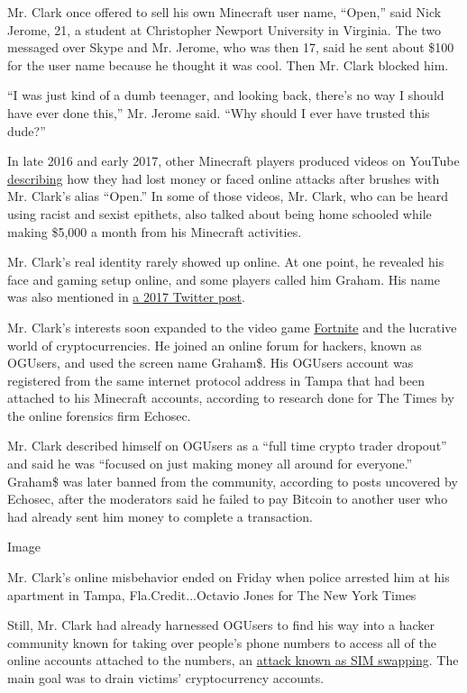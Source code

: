 Mr. Clark once offered to sell his own Minecraft user name, ``Open,''
said Nick Jerome, 21, a student at Christopher Newport University in
Virginia. The two messaged over Skype and Mr. Jerome, who was then 17,
said he sent about \$100 for the user name because he thought it was
cool. Then Mr. Clark blocked him.

``I was just kind of a dumb teenager, and looking back, there's no way I
should have ever done this,'' Mr. Jerome said. ``Why should I ever have
trusted this dude?''

In late 2016 and early 2017, other Minecraft players produced videos on
YouTube \href{https://www.youtube.com/watch?v=CvrPXbk-BXw}{describing}
how they had lost money or faced online attacks after brushes with Mr.
Clark's alias ``Open.'' In some of those videos, Mr. Clark, who can be
heard using racist and sexist epithets, also talked about being home
schooled while making \$5,000 a month from his Minecraft activities.

Mr. Clark's real identity rarely showed up online. At one point, he
revealed his face and gaming setup online, and some players called him
Graham. His name was also mentioned in
\href{https://twitter.com/opengrahamclark/status/848014008632344576}{a
2017 Twitter post}.

Mr. Clark's interests soon expanded to the video game
\href{https://www.nytimes.com/2018/07/25/arts/what-is-fortnite-battle-royale-nyt.html}{Fortnite}
and the lucrative world of cryptocurrencies. He joined an online forum
for hackers, known as OGUsers, and used the screen name Graham\$. His
OGUsers account was registered from the same internet protocol address
in Tampa that had been attached to his Minecraft accounts, according to
research done for The Times by the online forensics firm Echosec.

Mr. Clark described himself on OGUsers as a ``full time crypto trader
dropout'' and said he was ``focused on just making money all around for
everyone.'' Graham\$ was later banned from the community, according to
posts uncovered by Echosec, after the moderators said he failed to pay
Bitcoin to another user who had already sent him money to complete a
transaction.

Image

Mr. Clark's online misbehavior ended on Friday when police arrested him
at his apartment in Tampa, Fla.Credit...Octavio Jones for The New York
Times

Still, Mr. Clark had already harnessed OGUsers to find his way into a
hacker community known for taking over people's phone numbers to access
all of the online accounts attached to the numbers, an
\href{https://www.nytimes.com/2017/08/21/business/dealbook/phone-hack-bitcoin-virtual-currency.html}{attack
known as SIM swapping}. The main goal was to drain victims'
cryptocurrency accounts.

